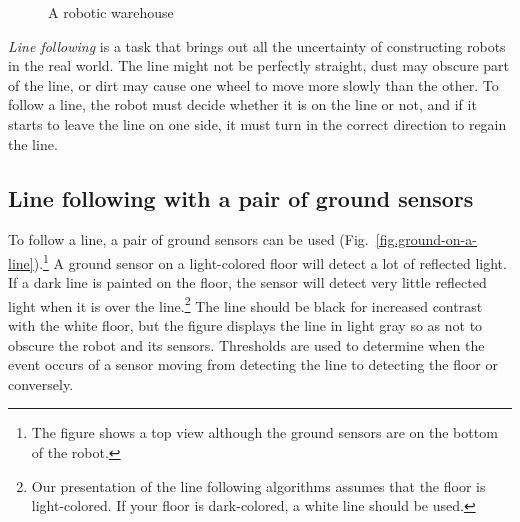\begin{figure}
\begin{center}
\caption{A robotic warehouse}\label{fig.warehouse}
\end{center}
\end{figure}

\emph{Line following} is a task that brings out all the uncertainty of constructing robots in the real world. The line might not be perfectly straight, dust may obscure part of the line, or dirt may cause one wheel to move more slowly than the other. To follow a line, the robot must decide whether it is on the line or not, and if it starts to leave the line on one side, it must turn in the correct direction to regain the line.

\subsection{Line following with a pair of ground sensors}

To follow a line, a pair of ground sensors can be used (Fig.~\ref{fig.ground-on-a-line}).\footnote{The figure shows a top view although the ground sensors are on the bottom of the robot.} A ground sensor on a light-colored floor will detect a lot of reflected light. If a dark line is painted on the floor, the sensor will detect very little reflected light when it is over the line.\footnote{Our presentation of the line following algorithms assumes that the floor is light-colored. If your floor is dark-colored, a white line should be used.} The line should be black for increased contrast with the white floor, but the figure displays the line in light gray so as not to obscure the robot and its sensors. Thresholds are used to determine when the event occurs of a sensor moving from detecting the line to detecting the floor or conversely.

